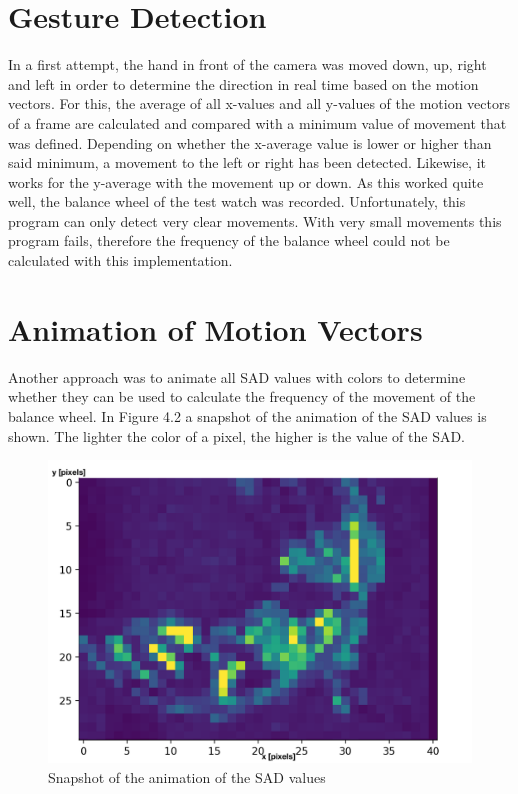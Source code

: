 \documentclass[12pt, a4paper]{report}
\begin{document}
    \section{Gesture Detection}
   In a first attempt, the hand in front of the camera was moved down, up, right and left in order to determine the direction in real time based on the motion vectors. 
    \newline
    For this, the average of all x-values and all y-values of the motion vectors of a frame are calculated and compared with a minimum value of movement that was defined. Depending on whether the x-average value is lower or higher than said minimum, a movement to the left or right has been detected. Likewise, it works for the y-average with the movement up or down.
        \newline
 As this worked quite well, the balance wheel of the test watch was recorded. Unfortunately, this program can only detect very clear movements. With very small movements this program fails, therefore the frequency of the balance wheel could not be calculated with this implementation. 
    
    \section{Animation of Motion Vectors}
    
   Another approach was to animate all SAD values with colors to determine whether they can be used to calculate the frequency of the movement of the balance wheel. In Figure 4.2 a snapshot of the animation of the SAD values is shown. The lighter the color of a pixel, the higher is the value of the SAD. 
    
    \noindent
    \begin{figure}[H]
    \centering
    \includegraphics[scale=0.6]{Images/animation_sad.png}
    
    \caption{Snapshot of the animation of the SAD values}
    \end{figure}
     
\end{document}
